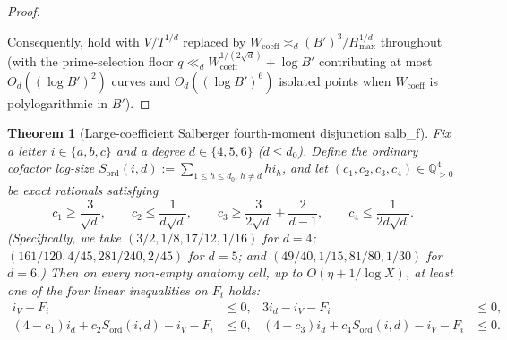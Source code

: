 \documentclass[11pt,a4paper]{amsart}
\theoremstyle{plain}
\newtheorem{theorem}{Theorem}[section]
\theoremstyle{definition}
\theoremstyle{remark}
\newcommand{\Q}{\mathbb{Q}}
\begin{document}
\begin{proof}
\begin{itemize}[itemsep=1pt]
\end{itemize}
Consequently, \cite[Main Lemma~3.2(i) and Theorem~3.16]{Salberger2023} hold with $V/T^{1/d}$ replaced by $W_{\mathrm{coeff}} \asymp_d (B')^3/H_{\max}^{1/d}$ throughout (with the prime-selection floor $q \ll_d W_{\mathrm{coeff}}^{1/(2\sqrt{d})} + \log B'$ contributing at most $O_d((\log B')^2)$ curves and $O_d((\log B')^6)$ isolated points when $W_{\mathrm{coeff}}$ is polylogarithmic in $B'$).
\end{proof}

\begin{theorem}[Large-coefficient Salberger fourth-moment disjunction \textsf{salb\_f}]\label{thm:salb_f}
Fix a letter $i \in \{a,b,c\}$ and a degree $d \in \{4, 5, 6\}$ ($d \le d_0$). Define the ordinary cofactor log-size $S_{\mathrm{ord}}(i,d) := \sum_{1 \le h \le d_0,\, h \neq d} h i_h$, and let $(c_1, c_2, c_3, c_4) \in \Q_{>0}^4$ be exact rationals satisfying
\begin{equation}\label{eq:salb_f_params}
  c_1 \ge \frac{3}{\sqrt{d}}, \qquad
  c_2 \le \frac{1}{d\sqrt{d}}, \qquad
  c_3 \ge \frac{3}{2\sqrt{d}} + \frac{2}{d-1}, \qquad
  c_4 \le \frac{1}{2 d\sqrt{d}}.
\end{equation}
(Specifically, we take $(3/2, 1/8, 17/12, 1/16)$ for $d=4$; $(161/120, 4/45, 281/240, 2/45)$ for $d=5$; and $(49/40, 1/15, 81/80, 1/30)$ for $d=6$.) Then on every non-empty anatomy cell, up to $O(\eta + 1/\log X)$, at least one of the four linear inequalities on $F_i$ holds:
\begin{equation}\label{eq:salb_f_disj}
\begin{aligned}
  i_V - F_i &\le 0, &
  3 i_d - i_V - F_i &\le 0, \\
  (4 - c_1) i_d + c_2 S_{\mathrm{ord}}(i,d) - i_V - F_i &\le 0, &
  (4 - c_3) i_d + c_4 S_{\mathrm{ord}}(i,d) - i_V - F_i &\le 0.
\end{aligned}
\end{equation}
\end{theorem}
\end{document}

